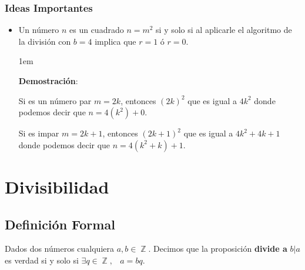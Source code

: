 \documentclass[12pt, fleqn]{report}                             %
\newcommand \Quote {\qq}                                        %
\newenvironment{SmallIndentation}[1][0.75em]                    %
    {\begin{adjustwidth}{#1}{}\begin{footnotesize}}                 %
    {\end{footnotesize}\end{adjustwidth}}                           %
\DeclareMathOperator \Space {\quad}                             %
\DeclareMathOperator \MiniSpace {\;}                            %
\DeclareMathOperator \Integers  {\mathbb{Z}}                     %
\begin{document}
            \subsubsection{Ideas Importantes}
            \begin{itemize}

                \item Un número $n$ es un cuadrado $n=m^2$ si y solo si al aplicarle
                el algoritmo de la división con $b=4$ implica que $r=1$ ó $r=0$.

                    \begin{SmallIndentation}[1em]
                        \textbf{Demostración}:

                        Si es un número par $m=2k$, entonces $(2k)^2$ que 
                        es igual a $4k^2$ donde podemos decir que
                        $n=4(k^2)+0$.

                        Si es impar $m=2k+1$, entonces $(2k+1)^2$ que 
                        es igual a $4k^2+4k+1$ donde podemos decir que
                        $n=4(k^2+k)+1$. 

                    \end{SmallIndentation}

                \end{itemize}




    \clearpage
    \section{Divisibilidad}



        \subsection*{Definición Formal}

            Dados dos números cualquiera $a, b \in \Integers$. Decimos que la proposición
            \textbf{\Quote{b} divide a \Quote{a}} $b|a$ es verdad si y solo si 
            $\exists q \in \Integers, \MiniSpace a = bq$.
\end{document}
